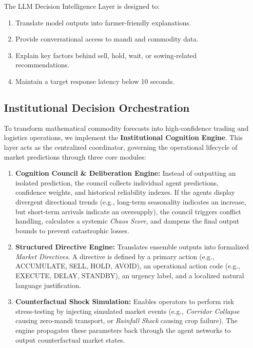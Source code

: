 \documentclass[12pt,a4paper]{report}
\begin{document}
The LLM Decision Intelligence Layer is designed to:

\begin{enumerate}
    \item Translate model outputs into farmer-friendly explanations.
    \item Provide conversational access to mandi and commodity data.
    \item Explain key factors behind sell, hold, wait, or sowing-related recommendations.
    \item Maintain a target response latency below 10 seconds.
\end{enumerate}

\subsection{Institutional Decision Orchestration}

To transform mathematical commodity forecasts into high-confidence trading and logistics operations, we implement the \textbf{Institutional Cognition Engine}. This layer acts as the centralized coordinator, governing the operational lifecycle of market predictions through three core modules:

\begin{enumerate}
    \item \textbf{Cognition Council \& Deliberation Engine:} 
    Instead of outputting an isolated prediction, the council collects individual agent predictions, confidence weights, and historical reliability indexes. If the agents display divergent directional trends (e.g., long-term seasonality indicates an increase, but short-term arrivals indicate an oversupply), the council triggers conflict handling, calculates a systemic \textit{Chaos Score}, and dampens the final output bounds to prevent catastrophic losses.
    
    \item \textbf{Structured Directive Engine:}
    Translates ensemble outputs into formalized \textit{Market Directives}. A directive is defined by a primary action (e.g., ACCUMULATE, SELL, HOLD, AVOID), an operational action code (e.g., EXECUTE, DELAY, STANDBY), an urgency label, and a localized natural language justification.
    
    \item \textbf{Counterfactual Shock Simulation:}
    Enables operators to perform risk stress-testing by injecting simulated market events (e.g., \textit{Corridor Collapse} causing zero-mandi transport, or \textit{Rainfall Shock} causing crop failure). The engine propagates these parameters back through the agent networks to output counterfactual market states.
\end{enumerate}
\end{document}

